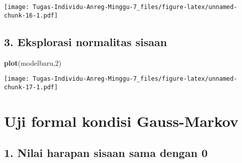 \documentclass[
]{article}
\newenvironment{Shaded}{\begin{snugshade}}{\end{snugshade}}
\newcommand{\AttributeTok}[1]{\textcolor[rgb]{0.13,0.29,0.53}{#1}}
\newcommand{\DecValTok}[1]{\textcolor[rgb]{0.00,0.00,0.81}{#1}}
\newcommand{\FloatTok}[1]{\textcolor[rgb]{0.00,0.00,0.81}{#1}}
\newcommand{\FunctionTok}[1]{\textcolor[rgb]{0.13,0.29,0.53}{\textbf{#1}}}
\newcommand{\NormalTok}[1]{#1}
\newcommand{\OtherTok}[1]{\textcolor[rgb]{0.56,0.35,0.01}{#1}}
\newcommand{\SpecialCharTok}[1]{\textcolor[rgb]{0.81,0.36,0.00}{\textbf{#1}}}
\newcommand{\StringTok}[1]{\textcolor[rgb]{0.31,0.60,0.02}{#1}}
\begin{document}
\begin{Shaded}
\end{Shaded}

\texttt{[image: Tugas-Individu-Anreg-Minggu-7\_files/figure-latex/unnamed-chunk-16-1.pdf]}

\hypertarget{eksplorasi-normalitas-sisaan}{%
\subsection{3. Eksplorasi normalitas
sisaan}\label{eksplorasi-normalitas-sisaan}}

\begin{Shaded}
\begin{Highlighting}[]
\FunctionTok{plot}\NormalTok{(modelbaru,}\DecValTok{2}\NormalTok{)}
\end{Highlighting}
\end{Shaded}

\texttt{[image: Tugas-Individu-Anreg-Minggu-7\_files/figure-latex/unnamed-chunk-17-1.pdf]}

\hypertarget{uji-formal-kondisi-gauss-markov}{%
\section{Uji formal kondisi
Gauss-Markov}\label{uji-formal-kondisi-gauss-markov}}

\hypertarget{nilai-harapan-sisaan-sama-dengan-0-1}{%
\subsection{1. Nilai harapan sisaan sama dengan
0}\label{nilai-harapan-sisaan-sama-dengan-0-1}}

\begin{Shaded}
\end{Shaded}
\end{document}
